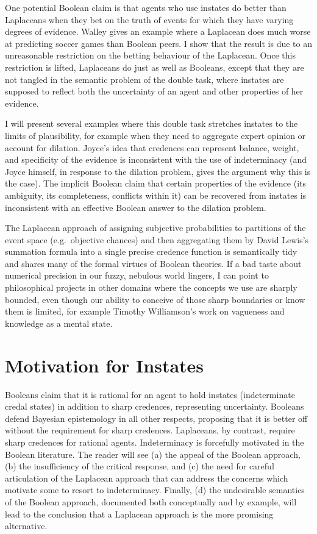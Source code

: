 One potential Boolean claim is that agents who use
instates do better than Laplaceans when they bet on the
truth of events for which they have varying degrees of
evidence. Walley gives an example where a Laplacean
does much worse at predicting soccer games than Boolean
peers. I show that the result is due to an unreasonable
restriction on the betting behaviour of the Laplacean.
Once this restriction is lifted, Laplaceans do just as
well as Booleans, except that they are not tangled in
the semantic problem of the double task, where instates
are supposed to reflect both the uncertainty of an
agent and other properties of her evidence.

I will present several examples where this double task
stretches instates to the limits of plausibility, for
example when they need to aggregate expert opinion or
account for dilation. Joyce's idea that credences can
represent balance, weight, and specificity of the
evidence is inconsistent with the use of indeterminacy
(and Joyce himself, in response to the dilation
problem, gives the argument why this is the case). The
implicit Boolean claim that certain properties of the
evidence (its ambiguity, its completeness, conflicts
within it) can be recovered from instates is
inconsistent with an effective Boolean answer to the
dilation problem.

The Laplacean approach of assigning subjective
probabilities to partitions of the event space (e.g.\
objective chances) and then aggregating them by David
Lewis's summation formula into a single precise
credence function is semantically tidy and shares many
of the formal virtues of Boolean theories. If a bad
taste about numerical precision in our fuzzy, nebulous
world lingers, I can point to philosophical projects in
other domains where the concepts we use are sharply
bounded, even though our ability to conceive of those
sharp boundaries or know them is limited, for example
Timothy Williamson's work on vagueness and knowledge as
a mental state.

\section{Motivation for Instates}
\label{MotivationForIndeterminateCredalStates}

Booleans claim that it is rational for an agent to hold
instates (indeterminate credal states) in addition to
sharp credences, representing uncertainty. Booleans
defend Bayesian epistemology in all other respects,
proposing that it is better off without the requirement
for sharp credences. Laplaceans, by contrast, require
sharp credences for rational agents. Indeterminacy is
forcefully motivated in the Boolean literature. The
reader will see (a) the appeal of the Boolean approach,
(b) the insufficiency of the critical response, and (c)
the need for careful articulation of the Laplacean
approach that can address the concerns which motivate
some to resort to indeterminacy. Finally, (d) the
undesirable semantics of the Boolean approach,
documented both conceptually and by example, will lead
to the conclusion that a Laplacean approach is the more
promising alternative.

